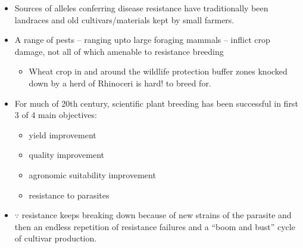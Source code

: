 \documentclass[11pt,dvipsnames,ignorenonframetext,aspectratio=169]{beamer}
\providecommand{\tightlist}{%
  \setlength{\itemsep}{0pt}\setlength{\parskip}{0pt}}
\begin{document}
\begin{frame}{}
\protect\hypertarget{section-4}{}
\small

\begin{itemize}
\tightlist
\item
  Sources of alleles conferring disease resistance have traditionally
  been landraces and old cultivars/materials kept by small farmers.
\item
  A range of pests -- ranging upto large foraging mammals -- inflict
  crop damage, not all of which amenable to resistance breeding

  \begin{itemize}
  \tightlist
  \item
    Wheat crop in and around the wildlife protection buffer zones
    knocked down by a herd of Rhinoceri is hard! to breed for.\\
  \end{itemize}
\item
  For much of 20th century, scientific plant breeding has been
  successful in first 3 of 4 main objectives:

  \begin{itemize}
  \tightlist
  \item
    yield improvement
  \item
    quality improvement
  \item
    agronomic suitability improvement
  \item
    resistance to parasites
  \end{itemize}
\item
  \(\because\) resistance keeps breaking down because of new strains of
  the parasite and then an endless repetition of resistance failures and
  a ``boom and bust'' cycle of cultivar production.
\end{itemize}
\end{frame}
\end{document}
